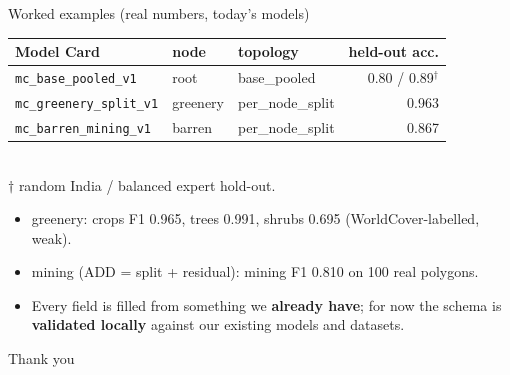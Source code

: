 \documentclass[aspectratio=169]{beamer}
\begin{document}
\begin{frame}{Worked examples (real numbers, today's models)}
\begin{center}\footnotesize
\begin{tabular}{@{}lllr@{}}
\toprule
Model Card & node & topology & held-out acc. \\
\midrule
\texttt{mc\_base\_pooled\_v1}    & root     & base\_pooled    & 0.80 / 0.89$^\dagger$ \\
\texttt{mc\_greenery\_split\_v1} & greenery & per\_node\_split & 0.963 \\
\texttt{mc\_barren\_mining\_v1}  & barren   & per\_node\_split & 0.867 \\
\bottomrule
\end{tabular}\\[2pt]
$\dagger$ random India / balanced expert hold-out.
\end{center}
\begin{itemize}\footnotesize
  \item greenery: crops F1 0.965, trees 0.991, shrubs 0.695 (WorldCover-labelled, weak).
  \item mining (ADD = split + residual): mining F1 0.810 on 100 real polygons.
  \item Every field is filled from something we \textbf{already have}; for now the schema is
  \textbf{validated locally} against our existing models and datasets.
\end{itemize}
\end{frame}

\begin{frame}
\centering
\Large Thank you
\end{frame}
\end{document}
